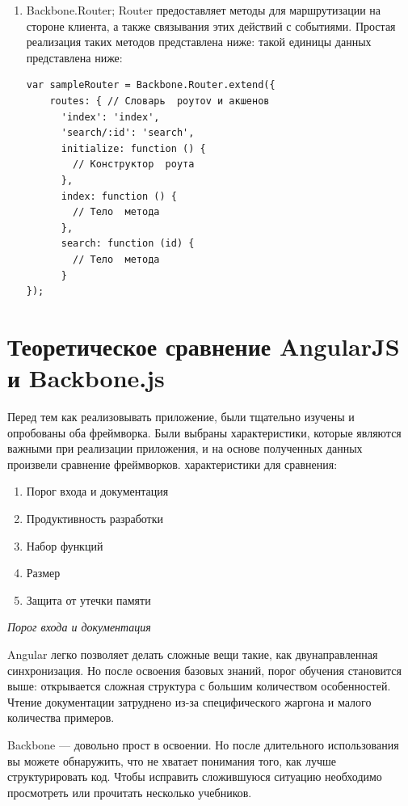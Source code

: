 \begin{enumerate}
\item Backbone.Router; Router предоставляет методы для маршрутизации на стороне клиента, а также связывания этих действий с событиями. Простая реализация таких методов представлена ниже:
такой единицы данных представлена ниже\cite{backdoc}:
\begin{lstlisting}[basicstyle=\normalsize]
var sampleRouter = Backbone.Router.extend({
    routes: { // Словарь  pоутоv и aкшенов
      'index': 'index',
      'search/:id': 'search',
      initialize: function () {
        // Конструктоp  pоута
      },
      index: function () {
        // Телo  метода
      },
      search: function (id) {
        // Телo  метода
      }
});
\end{lstlisting}

\end{enumerate}

\section {Теоретическое сравнение AngularJS и Backbone.js}

Перед тем как реализовывать приложение, были тщательно изучены и опробованы оба фреймворка. Были выбраны характеристики, которые являются важными при реализации приложения, и на основе полученных данных произвели сравнение фреймворков. характеристики для сравнения:
\begin {enumerate}
\item Порог входа и документация
\item Продуктивность разработки
\item Набор функций
\item Размер 
\item Защита от утечки памяти 
\end {enumerate}

{\itshape Порог входа и документация}

Angular легко позволяет делать сложные вещи такие, как двунаправленная синхронизация. Но после освоения базовых знаний, порог обучения становится выше: открывается сложная структура с большим количеством особенностей. Чтение документации затруднено из-за специфического жаргона и малого количества примеров.

Backbone — довольно прост в освоении. Но после длительного использования вы можете обнаружить, что не хватает понимания того, как лучше структурировать код. Чтобы исправить сложившуюся ситуацию необходимо просмотреть или прочитать несколько учебников. 

